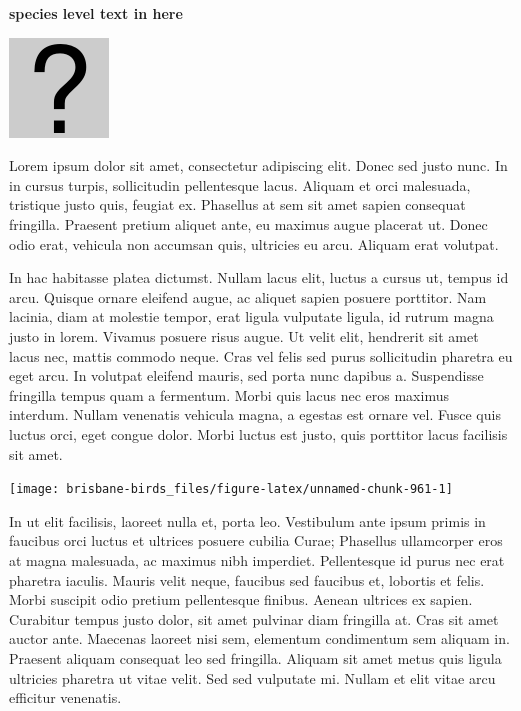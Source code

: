 \documentclass[]{book}
\let\origfigure\figure
\let\endorigfigure\endfigure
\renewenvironment{figure}[1][2] {
  \expandafter\origfigure\expandafter[H]
} {
  \endorigfigure
}
\begin{document}
\textbf{species level text in here}

\begin{figure}
\centering
\includegraphics{assets/missing.png}
\caption{No image for species}
\end{figure}

Lorem ipsum dolor sit amet, consectetur adipiscing elit. Donec sed justo
nunc. In in cursus turpis, sollicitudin pellentesque lacus. Aliquam et
orci malesuada, tristique justo quis, feugiat ex. Phasellus at sem sit
amet sapien consequat fringilla. Praesent pretium aliquet ante, eu
maximus augue placerat ut. Donec odio erat, vehicula non accumsan quis,
ultricies eu arcu. Aliquam erat volutpat.

In hac habitasse platea dictumst. Nullam lacus elit, luctus a cursus ut,
tempus id arcu. Quisque ornare eleifend augue, ac aliquet sapien posuere
porttitor. Nam lacinia, diam at molestie tempor, erat ligula vulputate
ligula, id rutrum magna justo in lorem. Vivamus posuere risus augue. Ut
velit elit, hendrerit sit amet lacus nec, mattis commodo neque. Cras vel
felis sed purus sollicitudin pharetra eu eget arcu. In volutpat eleifend
mauris, sed porta nunc dapibus a. Suspendisse fringilla tempus quam a
fermentum. Morbi quis lacus nec eros maximus interdum. Nullam venenatis
vehicula magna, a egestas est ornare vel. Fusce quis luctus orci, eget
congue dolor. Morbi luctus est justo, quis porttitor lacus facilisis sit
amet.

\begin{figure}
\texttt{[image: brisbane-birds\_files/figure-latex/unnamed-chunk-961-1]} \caption{insert figure caption}\label{fig:unnamed-chunk-961}
\end{figure}

In ut elit facilisis, laoreet nulla et, porta leo. Vestibulum ante ipsum
primis in faucibus orci luctus et ultrices posuere cubilia Curae;
Phasellus ullamcorper eros at magna malesuada, ac maximus nibh
imperdiet. Pellentesque id purus nec erat pharetra iaculis. Mauris velit
neque, faucibus sed faucibus et, lobortis et felis. Morbi suscipit odio
pretium pellentesque finibus. Aenean ultrices ex sapien. Curabitur
tempus justo dolor, sit amet pulvinar diam fringilla at. Cras sit amet
auctor ante. Maecenas laoreet nisi sem, elementum condimentum sem
aliquam in. Praesent aliquam consequat leo sed fringilla. Aliquam sit
amet metus quis ligula ultricies pharetra ut vitae velit. Sed sed
vulputate mi. Nullam et elit vitae arcu efficitur venenatis.
\end{document}
